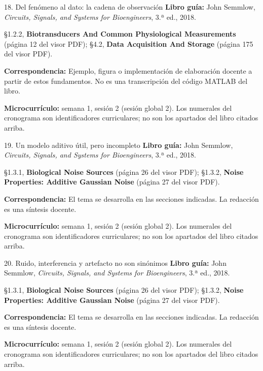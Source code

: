 \documentclass[
  10pt,
  ignorenonframetext,
  aspectratio=169,
  spanish,
]{beamer}
\begin{document}
\begin{frame}{18. Del fenómeno al dato: la cadena de observación}
\label{del-fenuxf3meno-al-dato-la-cadena-de-observaciuxf3n}
\textbf{Libro guía:} John Semmlow, \emph{Circuits, Signals, and Systems
for Bioengineers}, 3.ª ed., 2018.

§1.2.2, \textbf{Biotransducers And Common Physiological Measurements}
(página 12 del visor PDF); §4.2, \textbf{Data Acquisition And Storage}
(página 175 del visor PDF).

\textbf{Correspondencia:} Ejemplo, figura o implementación de
elaboración docente a partir de estos fundamentos. No es una
transcripción del código MATLAB del libro.

\textbf{Microcurrículo:} semana 1, sesión 2 (sesión global 2). Los
numerales del cronograma son identificadores curriculares; no son los
apartados del libro citados arriba.
\end{frame}

\begin{frame}{19. Un modelo aditivo útil, pero incompleto}
\label{un-modelo-aditivo-uxfatil-pero-incompleto}
\textbf{Libro guía:} John Semmlow, \emph{Circuits, Signals, and Systems
for Bioengineers}, 3.ª ed., 2018.

§1.3.1, \textbf{Biological Noise Sources} (página 26 del visor PDF);
§1.3.2, \textbf{Noise Properties: Additive Gaussian Noise} (página 27
del visor PDF).

\textbf{Correspondencia:} El tema se desarrolla en las secciones
indicadas. La redacción es una síntesis docente.

\textbf{Microcurrículo:} semana 1, sesión 2 (sesión global 2). Los
numerales del cronograma son identificadores curriculares; no son los
apartados del libro citados arriba.
\end{frame}

\begin{frame}{20. Ruido, interferencia y artefacto no son sinónimos}
\label{ruido-interferencia-y-artefacto-no-son-sinuxf3nimos}
\textbf{Libro guía:} John Semmlow, \emph{Circuits, Signals, and Systems
for Bioengineers}, 3.ª ed., 2018.

§1.3.1, \textbf{Biological Noise Sources} (página 26 del visor PDF);
§1.3.2, \textbf{Noise Properties: Additive Gaussian Noise} (página 27
del visor PDF).

\textbf{Correspondencia:} El tema se desarrolla en las secciones
indicadas. La redacción es una síntesis docente.

\textbf{Microcurrículo:} semana 1, sesión 2 (sesión global 2). Los
numerales del cronograma son identificadores curriculares; no son los
apartados del libro citados arriba.
\end{frame}
\end{document}
